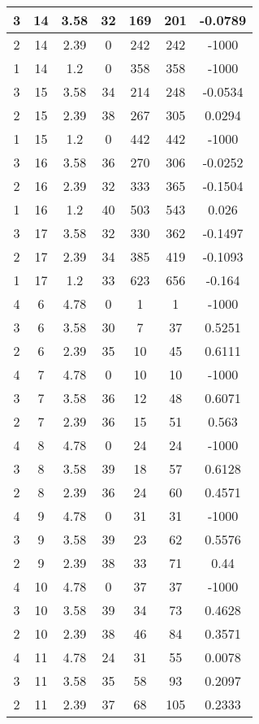 \documentclass[letterpaper, 12pt]{article}
\begin{document}
\begin{longtable}{|c|c|c|c|c|c|c|}
\hline
3 & 14 & 3.58 & 32 & 169 & 201 & -0.0789 \\
\hline
2 & 14 & 2.39 & 0 & 242 & 242 & -1000 \\
\hline
1 & 14 & 1.2 & 0 & 358 & 358 & -1000 \\
\hline
3 & 15 & 3.58 & 34 & 214 & 248 & -0.0534 \\
\hline
2 & 15 & 2.39 & 38 & 267 & 305 & 0.0294 \\
\hline
1 & 15 & 1.2 & 0 & 442 & 442 & -1000 \\
\hline
3 & 16 & 3.58 & 36 & 270 & 306 & -0.0252 \\
\hline
2 & 16 & 2.39 & 32 & 333 & 365 & -0.1504 \\
\hline
1 & 16 & 1.2 & 40 & 503 & 543 & 0.026 \\
\hline
3 & 17 & 3.58 & 32 & 330 & 362 & -0.1497 \\
\hline
2 & 17 & 2.39 & 34 & 385 & 419 & -0.1093 \\
\hline
1 & 17 & 1.2 & 33 & 623 & 656 & -0.164 \\
\hline
4 & 6 & 4.78 & 0 & 1 & 1 & -1000 \\
\hline
3 & 6 & 3.58 & 30 & 7 & 37 & 0.5251 \\
\hline
2 & 6 & 2.39 & 35 & 10 & 45 & 0.6111 \\
\hline
4 & 7 & 4.78 & 0 & 10 & 10 & -1000 \\
\hline
3 & 7 & 3.58 & 36 & 12 & 48 & 0.6071 \\
\hline
2 & 7 & 2.39 & 36 & 15 & 51 & 0.563 \\
\hline
4 & 8 & 4.78 & 0 & 24 & 24 & -1000 \\
\hline
3 & 8 & 3.58 & 39 & 18 & 57 & 0.6128 \\
\hline
2 & 8 & 2.39 & 36 & 24 & 60 & 0.4571 \\
\hline
4 & 9 & 4.78 & 0 & 31 & 31 & -1000 \\
\hline
3 & 9 & 3.58 & 39 & 23 & 62 & 0.5576 \\
\hline
2 & 9 & 2.39 & 38 & 33 & 71 & 0.44 \\
\hline
4 & 10 & 4.78 & 0 & 37 & 37 & -1000 \\
\hline
3 & 10 & 3.58 & 39 & 34 & 73 & 0.4628 \\
\hline
2 & 10 & 2.39 & 38 & 46 & 84 & 0.3571 \\
\hline
4 & 11 & 4.78 & 24 & 31 & 55 & 0.0078 \\
\hline
3 & 11 & 3.58 & 35 & 58 & 93 & 0.2097 \\
\hline
2 & 11 & 2.39 & 37 & 68 & 105 & 0.2333 \\

\end{longtable}
\end{document}
